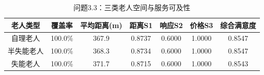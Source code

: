 \begin{table}[h]
\centering
\caption{问题3.3：三类老人空间与服务可及性}
\begin{tabular}{|c|c|c|c|c|c|c|}
\hline
老人类型 & 覆盖率 & 平均距离(m) & 距离S1 & 响应S2 & 价格S3 & 综合满意度 \\
\hline
自理老人 & 100.0\% & 367.9 & 0.8737 & 0.6000 & 1.0000 & 0.8547 \\
半失能老人 & 100.0\% & 368.3 & 0.8734 & 0.6000 & 1.0000 & 0.8547 \\
失能老人 & 100.0\% & 371.7 & 0.8715 & 0.6000 & 1.0000 & 0.8543 \\
\hline
\end{tabular}
\end{table}